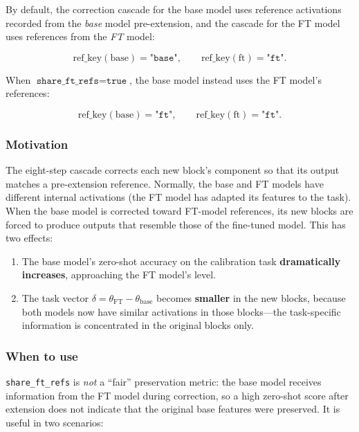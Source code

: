 \documentclass[11pt,a4paper]{article}
\begin{document}
By default, the correction cascade for the base model uses reference
activations recorded from the \emph{base} model pre-extension, and the
cascade for the FT model uses references from the \emph{FT} model:

\begin{equation}
    \text{ref\_key}(\text{base}) = \texttt{"base"}, \qquad
    \text{ref\_key}(\text{ft})   = \texttt{"ft"}.
\end{equation}

When $\texttt{share\_ft\_refs} = \texttt{true}$, the base model instead
uses the FT model's references:

\begin{equation}
    \text{ref\_key}(\text{base}) = \texttt{"ft"}, \qquad
    \text{ref\_key}(\text{ft})   = \texttt{"ft"}.
\end{equation}

\subsubsection{Motivation}

The eight-step cascade corrects each new block's component so that its
output matches a pre-extension reference. Normally, the base and FT models
have different internal activations (the FT model has adapted its features
to the task). When the base model is corrected toward FT-model references,
its new blocks are forced to produce outputs that resemble those of the
fine-tuned model. This has two effects:

\begin{enumerate}
    \item The base model's zero-shot accuracy on the calibration task
    \textbf{dramatically increases}, approaching the FT model's level.
    \item The task vector $\delta = \theta_{\text{FT}} -
    \theta_{\text{base}}$ becomes \textbf{smaller} in the new blocks,
    because both models now have similar activations in those blocks---the
    task-specific information is concentrated in the original blocks only.
\end{enumerate}

\subsubsection{When to use}

\texttt{share\_ft\_refs} is {\em not} a ``fair'' preservation metric: the
base model receives information from the FT model during correction, so a
high zero-shot score after extension does not indicate that the original
base features were preserved. It is useful in two scenarios:
\end{document}
